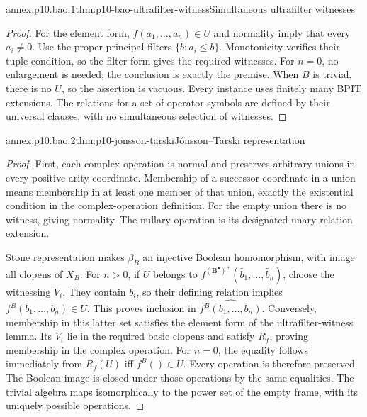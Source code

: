 \begin{annexitem}{annex:p10.bao.1}{thm:p10-bao-ultrafilter-witness}{Simultaneous ultrafilter witnesses}
\begin{proof}
For the element form, \(f(a_1,\ldots,a_n)\in U\) and normality
imply that every \(a_i\ne0\).
Use the proper principal filters \(\{b:a_i\leq b\}\).
Monotonicity verifies their tuple condition, so the filter form
gives the required witnesses.
For \(n=0\), no enlargement is needed; the conclusion is exactly
the premise. When \(B\) is trivial, there is no \(U\), so the
assertion is vacuous.
Every instance uses finitely many BPIT extensions.
The relations for a set of operator symbols are defined by their
universal clauses, with no simultaneous selection of witnesses.
\end{proof}
\end{annexitem}

\begin{annexitem}{annex:p10.bao.2}{thm:p10-jonsson-tarski}{J\'onsson--Tarski representation}
\begin{proof}
First, each complex operation is normal and preserves arbitrary
unions in every positive-arity coordinate.
Membership of a successor coordinate in a union means membership
in at least one member of that union, exactly the existential
condition in the complex-operation definition.
For the empty union there is no witness, giving normality.
The nullary operation is its designated unary relation extension.

Stone representation makes \(\beta_B\) an injective Boolean
homomorphism, with image all clopens of \(X_B\).
For \(n>0\), if \(U\) belongs to
\(f^{(\mathbf B^\bullet)^+}(\widehat b_1,\ldots,\widehat b_n)\),
choose the witnessing \(V_i\).
They contain \(b_i\), so their defining relation implies
\(f^B(b_1,\ldots,b_n)\in U\).
This proves inclusion in \(\widehat{f^B(b_1,\ldots,b_n)}\).
Conversely, membership in this latter set satisfies the element
form of the ultrafilter-witness lemma.
Its \(V_i\) lie in the required basic clopens and satisfy \(R_f\),
proving membership in the complex operation.
For \(n=0\), the equality follows immediately from
\(R_f(U)\) iff \(f^B()\in U\).
Every operation is therefore preserved.
The Boolean image is closed under those operations by the same
equalities.
The trivial algebra maps isomorphically to the power set of the
empty frame, with its uniquely possible operations.
\end{proof}
\end{annexitem}

